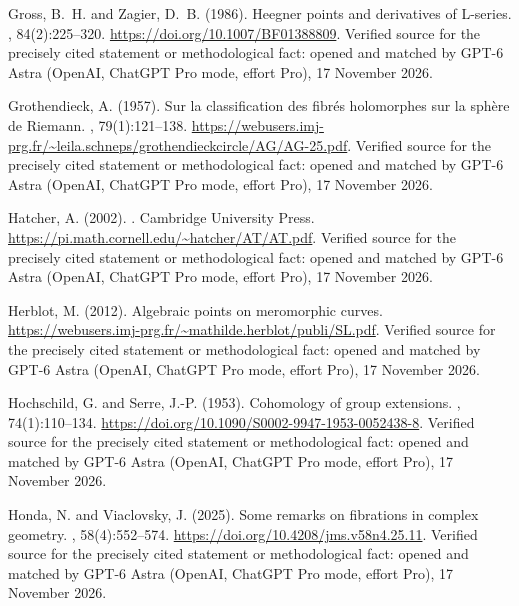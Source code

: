 \begin{thebibliography}{}
Gross, B.~H. and Zagier, D.~B. (1986).
\newblock Heegner points and derivatives of {L}-series.
, 84(2):225--320.
\newblock \url{https://doi.org/10.1007/BF01388809}. Verified source for the precisely cited statement or methodological fact: opened and matched by GPT-6 Astra (OpenAI, ChatGPT Pro mode, effort Pro), 17 November 2026.

Grothendieck, A. (1957).
\newblock Sur la classification des fibr{\'e}s holomorphes sur la sph{\`e}re de
  {Riemann}.
, 79(1):121--138.
\newblock \url{https://webusers.imj-prg.fr/~leila.schneps/grothendieckcircle/AG/AG-25.pdf}. Verified source for the precisely cited statement or methodological fact: opened and matched by GPT-6 Astra (OpenAI, ChatGPT Pro mode, effort Pro), 17 November 2026.

Hatcher, A. (2002).
.
\newblock Cambridge University Press.
\newblock \url{https://pi.math.cornell.edu/~hatcher/AT/AT.pdf}. Verified source for the precisely cited statement or methodological fact: opened and matched by GPT-6 Astra (OpenAI, ChatGPT Pro mode, effort Pro), 17 November 2026.

Herblot, M. (2012).
\newblock Algebraic points on meromorphic curves.
\newblock \url{https://webusers.imj-prg.fr/~mathilde.herblot/publi/SL.pdf}. Verified source for the precisely cited statement or methodological fact: opened and matched by GPT-6 Astra (OpenAI, ChatGPT Pro mode, effort Pro), 17 November 2026.

Hochschild, G. and Serre, J.-P. (1953).
\newblock Cohomology of group extensions.
,
  74(1):110--134.
\newblock \url{https://doi.org/10.1090/S0002-9947-1953-0052438-8}. Verified source for the precisely cited statement or methodological fact: opened and matched by GPT-6 Astra (OpenAI, ChatGPT Pro mode, effort Pro), 17 November 2026.

Honda, N. and Viaclovsky, J. (2025).
\newblock Some remarks on fibrations in complex geometry.
, 58(4):552--574.
\newblock \url{https://doi.org/10.4208/jms.v58n4.25.11}. Verified source for the precisely cited statement or methodological fact: opened and matched by GPT-6 Astra (OpenAI, ChatGPT Pro mode, effort Pro), 17 November 2026.


\end{thebibliography}
